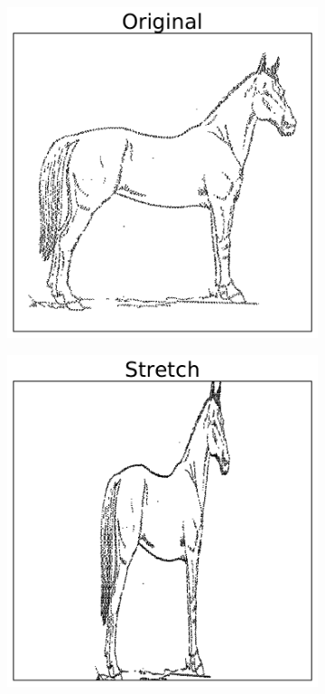 \begin{figure}[H] %
\captionsetup[subfigure]{justification=centering}
\centering
\begin{subfigure}{.32\textwidth}
    \centering
    \includegraphics[width=\linewidth]{figures/OriginalHorse.pdf}
\end{subfigure}
%
\begin{subfigure}{.32\textwidth}
    \centering
    \includegraphics[width=\linewidth]{figures/StretchHorse.pdf}

\end{subfigure}
\end{figure}
